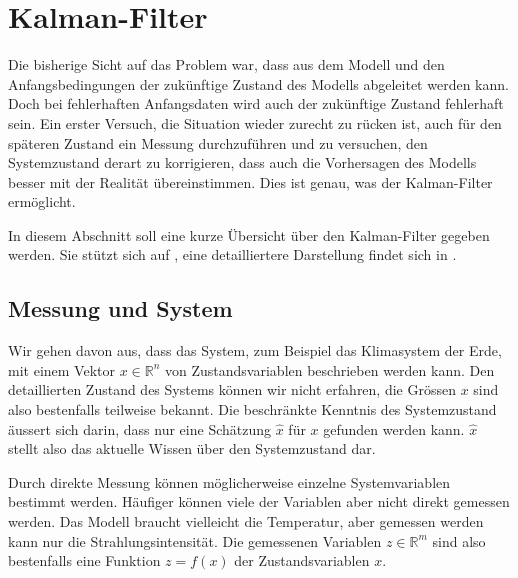 %
%
%
\section{Kalman-Filter\label{section:kalman-filter}}
%
Die bisherige Sicht auf das Problem war, dass aus dem Modell und den
Anfangsbedingungen der zukünftige Zustand des Modells abgeleitet werden
kann.
Doch bei fehlerhaften Anfangsdaten wird auch der zukünftige Zustand
fehlerhaft sein.
Ein erster Versuch, die Situation wieder zurecht zu rücken ist, auch für
den späteren Zustand ein Messung durchzuführen und zu versuchen,
den Systemzustand derart zu korrigieren, dass auch die Vorhersagen des
Modells besser mit der Realität übereinstimmen.
Dies ist genau, was der Kalman-Filter ermöglicht.

In diesem Abschnitt soll eine kurze Übersicht über den Kalman-Filter
gegeben werden.
Sie stützt sich auf \cite{skript:catlin}, eine detailliertere Darstellung
findet sich in \cite[Kapitel 8]{skript:wrstatskript}.

\subsection{Messung und System\label{subsection:messung und system}}
Wir gehen davon aus, dass das System, zum Beispiel das Klimasystem der Erde,
mit einem Vektor $x\in\mathbb R^n$ von Zustandsvariablen beschrieben werden
kann.
Den detaillierten Zustand des Systems können wir nicht erfahren, die
Grössen $x$ sind also bestenfalls teilweise bekannt.
Die beschränkte Kenntnis des Systemzustand äussert sich darin, dass
nur eine Schätzung $\hat x$ für $x$ gefunden werden kann.
$\hat x$ stellt also das aktuelle Wissen über den Systemzustand dar.

Durch direkte Messung können möglicherweise einzelne Systemvariablen
bestimmt werden.
Häufiger können viele der Variablen aber nicht direkt gemessen werden.
Das Modell braucht vielleicht die Temperatur, aber gemessen werden kann nur
die Strahlungsintensität.
Die gemessenen Variablen $z\in\mathbb R^m$ sind also bestenfalls eine
Funktion $z=f(x)$ der Zustandsvariablen $x$.

